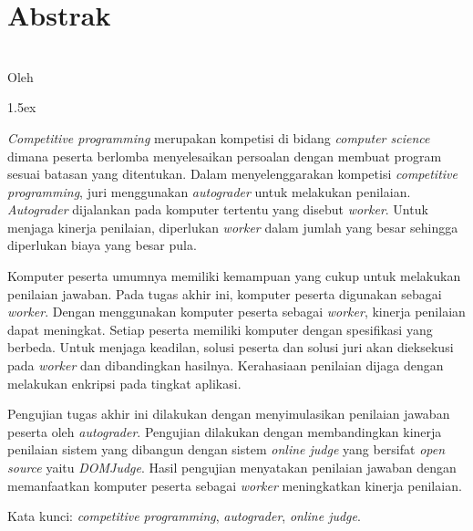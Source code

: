 \clearpage

\chapter*{Abstrak}

\begin{center}
    \textbf{\large {\MakeUppercase{\thetitle}}} \\
    \normalsize Oleh \theauthor
\end{center}

\parindent 0pt
\parskip 1.5ex
\renewcommand{\baselinestretch}{1.0} %
\par \textit{Competitive programming} merupakan kompetisi di bidang \textit{computer science} dimana peserta berlomba menyelesaikan persoalan dengan membuat program sesuai batasan yang ditentukan. Dalam menyelenggarakan kompetisi \textit{competitive programming}, juri menggunakan \textit{autograder} untuk melakukan penilaian. \textit{Autograder} dijalankan pada komputer tertentu yang disebut \textit{worker}. Untuk menjaga kinerja penilaian, diperlukan \textit{worker} dalam jumlah yang besar sehingga diperlukan biaya yang besar pula. 

\par Komputer peserta umumnya memiliki kemampuan yang cukup untuk melakukan penilaian jawaban. Pada tugas akhir ini, komputer peserta digunakan sebagai \textit{worker}. Dengan menggunakan komputer peserta sebagai \textit{worker}, kinerja penilaian dapat meningkat. Setiap peserta memiliki komputer dengan spesifikasi yang berbeda. Untuk menjaga keadilan, solusi peserta dan solusi juri akan dieksekusi pada \textit{worker} dan dibandingkan hasilnya. Kerahasiaan penilaian dijaga dengan melakukan enkripsi pada tingkat aplikasi.

\par Pengujian tugas akhir ini dilakukan dengan menyimulasikan penilaian jawaban peserta oleh \textit{autograder}. Pengujian dilakukan dengan membandingkan kinerja penilaian sistem yang dibangun dengan sistem \textit{online judge} yang bersifat \textit{open source} yaitu \textit{DOMJudge}. Hasil pengujian menyatakan penilaian jawaban dengan memanfaatkan komputer peserta sebagai \textit{worker} meningkatkan kinerja penilaian.

\par Kata kunci: \textit{competitive programming}, \textit{autograder}, \textit{online judge}.

\clearpage